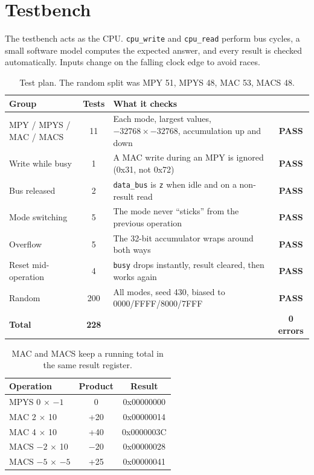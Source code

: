 \documentclass[11pt,a4paper]{article}
\newcommand{\pass}{\textcolor{okgreen}{\textbf{PASS}}}
\begin{document}
\section{Testbench}
The testbench acts as the CPU. \texttt{cpu\_write} and \texttt{cpu\_read} perform bus cycles,
a small software model computes the expected answer, and every result is checked automatically.
Inputs change on the falling clock edge to avoid races.

\begin{table}[H]\centering\small
\begin{tabularx}{\linewidth}{lcXc}
\toprule
Group & Tests & What it checks & \\
\midrule
MPY / MPYS / MAC / MACS & 11 & Each mode, largest values, $-32768 \times -32768$, accumulation up and down & \pass \\
Write while busy & 1 & A MAC write during an MPY is ignored (0x31, not 0x72) & \pass \\
Bus released & 2 & \texttt{data\_bus} is \texttt{z} when idle and on a non-result read & \pass \\
Mode switching & 5 & The mode never ``sticks'' from the previous operation & \pass \\
Overflow & 5 & The 32-bit accumulator wraps around both ways & \pass \\
Reset mid-operation & 4 & \texttt{busy} drops instantly, result cleared, then works again & \pass \\
Random & 200 & All modes, seed 430, biased to 0000/FFFF/8000/7FFF & \pass \\
\midrule
\textbf{Total} & \textbf{228} & & \textbf{0 errors} \\
\bottomrule
\end{tabularx}
\caption{Test plan. The random split was MPY 51, MPYS 48, MAC 53, MACS 48.}
\end{table}

\begin{table}[H]\centering\small
\begin{tabular}{lcc}
\toprule
Operation & Product & Result \\
\midrule
MPYS 0 $\times$ $-1$ & 0 & 0x00000000 \\
MAC 2 $\times$ 10 & +20 & 0x00000014 \\
MAC 4 $\times$ 10 & +40 & 0x0000003C \\
MACS $-2$ $\times$ 10 & $-20$ & 0x00000028 \\
MACS $-5$ $\times$ $-5$ & +25 & 0x00000041 \\
\bottomrule
\end{tabular}
\caption{MAC and MACS keep a running total in the same result register.}
\end{table}
\end{document}
